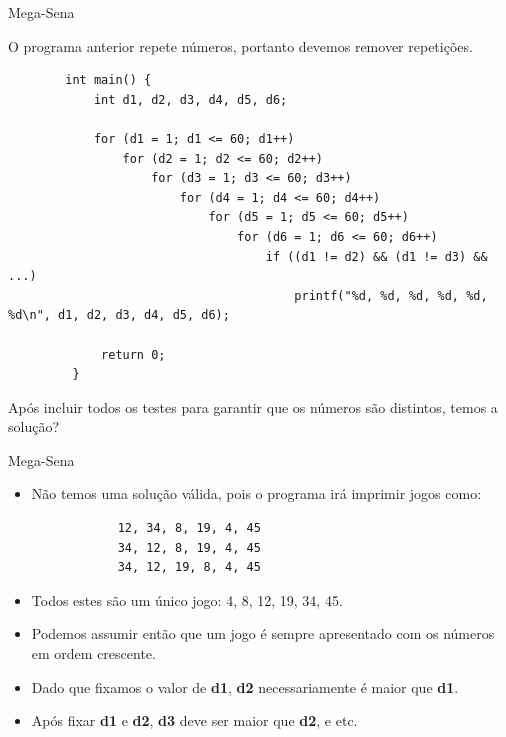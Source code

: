 \documentclass[handout]{beamer}
\begin{document}
\begin{frame}[fragile]{Mega-Sena}

    O programa anterior repete números, portanto devemos remover repetições.

    \begin{verbatim}
        int main() {
            int d1, d2, d3, d4, d5, d6;

            for (d1 = 1; d1 <= 60; d1++)
                for (d2 = 1; d2 <= 60; d2++)
                    for (d3 = 1; d3 <= 60; d3++)
                        for (d4 = 1; d4 <= 60; d4++)
                            for (d5 = 1; d5 <= 60; d5++)
                                for (d6 = 1; d6 <= 60; d6++)
                                    if ((d1 != d2) && (d1 != d3) && ...)
                                        printf("%d, %d, %d, %d, %d, %d\n", d1, d2, d3, d4, d5, d6);

             return 0;
         }
    \end{verbatim}

    Após incluir todos os testes para garantir que os números são distintos, temos a solução?
\end{frame}

\begin{frame}[fragile]{Mega-Sena}

    \begin{itemize}
        \item Não temos uma solução válida, pois o programa irá imprimir jogos como:
    
        \begin{verbatim}
            12, 34, 8, 19, 4, 45
            34, 12, 8, 19, 4, 45
            34, 12, 19, 8, 4, 45
        \end{verbatim}

        \item Todos estes são um único jogo: 4, 8, 12, 19, 34, 45.
        \item Podemos assumir então que um jogo é sempre apresentado com os números em ordem crescente.
        \item Dado que fixamos o valor de {\bf d1}, {\bf d2} necessariamente é maior que {\bf d1}.
        \item Após fixar {\bf d1} e {\bf d2}, {\bf d3} deve ser maior que {\bf d2}, e etc.
    \end{itemize}
\end{frame}
\end{document}
